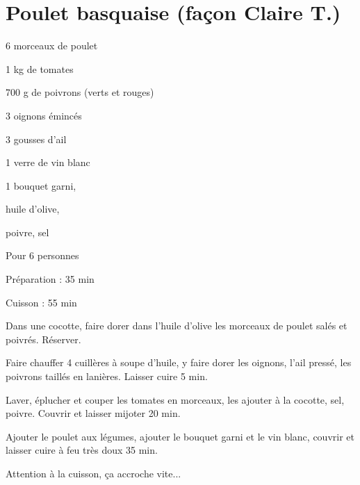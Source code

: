 \section[\normalsize{Poulet basquaise (fa\c con Claire T.)}]{Poulet basquaise (fa\c con Claire T.)}

\begin{ingredients}
\item 6 morceaux de poulet 
\item 1 kg de tomates 
\item 700 g de poivrons (verts et rouges) 
\item 3 oignons \'eminc\'es 
\item 3 gousses d'ail 
\item 1 verre de vin blanc
\item 1 bouquet garni, 
\item huile d'olive, 
\item poivre, sel
\end{ingredients}
\begin{infos}
\item Pour 6 personnes
\item Préparation : 35 min
\item Cuisson : 55 min
\end{infos}
\begin{etapes}
\item Dans une cocotte, faire dorer dans l'huile d'olive les morceaux de poulet sal\'es et poivr\'es. R\'eserver.
\item Faire chauffer 4 cuill\`eres \`a soupe d'huile, y faire dorer les oignons, l'ail press\'e, les poivrons taill\'es en lani\`eres. Laisser cuire 5 min.
\item Laver, \'eplucher et couper les tomates en morceaux, les ajouter \`a la cocotte, sel, poivre. Couvrir et laisser mijoter 20 min.
\item Ajouter le poulet aux l\'egumes, ajouter le bouquet garni et le vin blanc, couvrir et laisser cuire \`a feu tr\`es doux 35 min. 
\end{etapes}
\begin{conseils}
Attention \`a la cuisson, ça accroche vite...
\end{conseils}


